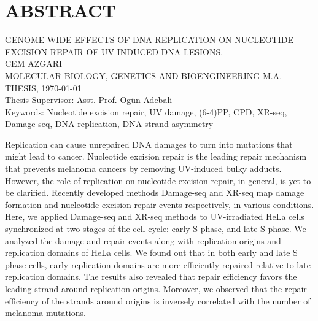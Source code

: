 \setcounter{page}{3}
\chapter*{\vspace{-4\baselineskip} \bf ABSTRACT} 

\begin{center}
\MakeUppercase{GENOME-WIDE EFFECTS OF DNA REPLICATION ON
NUCLEOTIDE EXCISION REPAIR OF UV-INDUCED
DNA LESIONS.} \\[3\baselineskip]
\MakeUppercase{Cem Azgari} \\[\baselineskip]
MOLECULAR BIOLOGY, GENETICS AND BIOENGINEERING M.A. THESIS, \Cemdateformat\today \\[\baselineskip]
Thesis Supervisor: Asst. Prof. Ogün Adebali \\[2\baselineskip]
Keywords: Nucleotide excision repair, UV damage, (6-4)PP, CPD, XR-seq, Damage-seq, DNA replication, DNA strand asymmetry \\[2\baselineskip]
\end{center}

\singlespacing
Replication can cause unrepaired DNA damages to turn into mutations that might lead to cancer. Nucleotide excision repair is the leading repair mechanism that prevents melanoma cancers by removing UV-induced bulky adducts. However, the role of replication on nucleotide excision repair, in general, is yet to be clarified. Recently developed methods Damage-seq and XR-seq map damage formation and nucleotide excision repair events respectively, in various conditions. Here, we applied Damage-seq and XR-seq methods to UV-irradiated HeLa cells synchronized at two stages of the cell cycle: early S phase, and late S phase. We analyzed the damage and repair events along with replication origins and replication domains of HeLa cells. We found out that in both early and late S phase cells, early replication domains are more efficiently repaired relative to late replication domains. The results also revealed that repair efficiency favors the leading strand around replication origins. Moreover, we observed that the repair efficiency of the strands around origins is inversely correlated with the number of melanoma mutations.

\clearpage\pagebreak
\onehalfspacing
